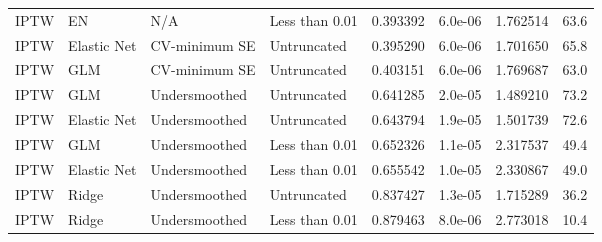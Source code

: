 \begin{longtable}[l]{llllllll}
IPTW & EN & N/A & Less than 0.01 & 0.393392 & 6.0e-06 & 1.762514 & 63.6\\
IPTW & Elastic Net & CV-minimum SE & Untruncated & 0.395290 & 6.0e-06 & 1.701650 & 65.8\\
IPTW & GLM & CV-minimum SE & Untruncated & 0.403151 & 6.0e-06 & 1.769687 & 63.0\\
IPTW & GLM & Undersmoothed & Untruncated & 0.641285 & 2.0e-05 & 1.489210 & 73.2\\
IPTW & Elastic Net & Undersmoothed & Untruncated & 0.643794 & 1.9e-05 & 1.501739 & 72.6\\
IPTW & GLM & Undersmoothed & Less than 0.01 & 0.652326 & 1.1e-05 & 2.317537 & 49.4\\
IPTW & Elastic Net & Undersmoothed & Less than 0.01 & 0.655542 & 1.0e-05 & 2.330867 & 49.0\\
IPTW & Ridge & Undersmoothed & Untruncated & 0.837427 & 1.3e-05 & 1.715289 & 36.2\\
IPTW & Ridge & Undersmoothed & Less than 0.01 & 0.879463 & 8.0e-06 & 2.773018 & 10.4\\
\bottomrule
\end{longtable}
